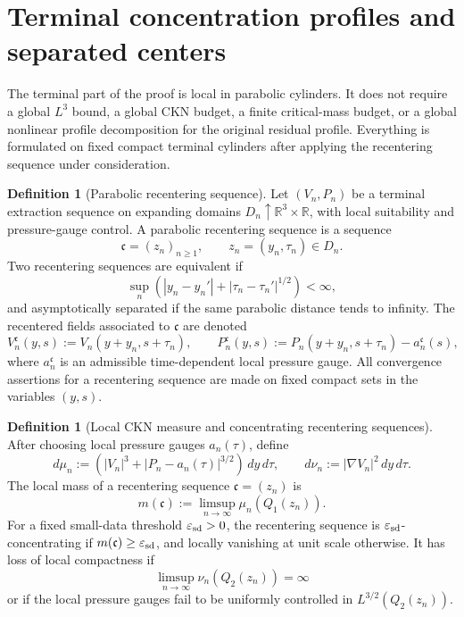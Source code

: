 \documentclass[11pt]{amsart}
\numberwithin{equation}{section}
\theoremstyle{plain}
\theoremstyle{definition}
\newtheorem{definition}[theorem]{Definition}
\theoremstyle{remark}
\newcommand{\R}{\mathbb R}
\newcommand{\eps}{\varepsilon}
\begin{document}
\section{Terminal concentration profiles and separated centers}
\label{sec:terminal-concentration}

The terminal part of the proof is local in parabolic cylinders.  It does not require a
global \(L^3\) bound, a global CKN budget, a finite critical-mass budget, or a
global nonlinear profile decomposition for the original residual profile.
Everything is formulated on fixed compact terminal cylinders after applying the
recentering sequence under consideration.

\begin{definition}[Parabolic recentering sequence]
\label{def:parabolic-recentering-sequence}
Let \((V_n,P_n)\) be a terminal extraction sequence on expanding domains
\(D_n\uparrow \R^3\times\R\), with local suitability and pressure-gauge
control.  A parabolic recentering sequence is a sequence
\[
   \mathfrak c=(z_n)_{n\ge1},\qquad z_n=(y_n,\tau_n)\in D_n .
\]
Two recentering sequences are equivalent if
\[
   \sup_n\left(|y_n-y_n'|+|\tau_n-\tau_n'|^{1/2}\right)<\infty,
\]
and asymptotically separated if the same parabolic distance tends to infinity.
The recentered fields associated to \(\mathfrak c\) are denoted
\[
   V_n^{\mathfrak c}(y,s):=V_n(y+y_n,s+\tau_n),
   \qquad
   P_n^{\mathfrak c}(y,s):=
   P_n(y+y_n,s+\tau_n)-a_n^{\mathfrak c}(s),
\]
where \(a_n^{\mathfrak c}\) is an admissible time-dependent local pressure
gauge.  All convergence assertions for a recentering sequence are made on fixed
compact sets in the variables \((y,s)\).
\end{definition}

\begin{definition}[Local CKN measure and concentrating recentering sequences]
\label{def:terminal-measures}
After choosing local pressure gauges \(a_n(\tau)\), define
\[
   d\mu_n
   :=
   \left(|V_n|^3+|P_n-a_n(\tau)|^{3/2}\right)\,dy\,d\tau,
   \qquad
   d\nu_n:=|\nabla V_n|^2\,dy\,d\tau .
\]
The local mass of a recentering sequence \(\mathfrak c=(z_n)\) is
\[
   m(\mathfrak c):=\limsup_{n\to\infty}\mu_n(Q_1(z_n)).
\]
For a fixed small-data threshold \(\eps_{\rm sd}>0\), the recentering sequence
is \(\eps_{\rm sd}\)-concentrating if \(m(\mathfrak c)\ge\eps_{\rm sd}\), and
locally vanishing at unit scale otherwise.  It has loss of local compactness if
\[
   \limsup_{n\to\infty}\nu_n(Q_2(z_n))=\infty
\]
or if the local pressure gauges fail to be uniformly controlled in
\(L^{3/2}(Q_2(z_n))\).
\end{definition}
\end{document}
